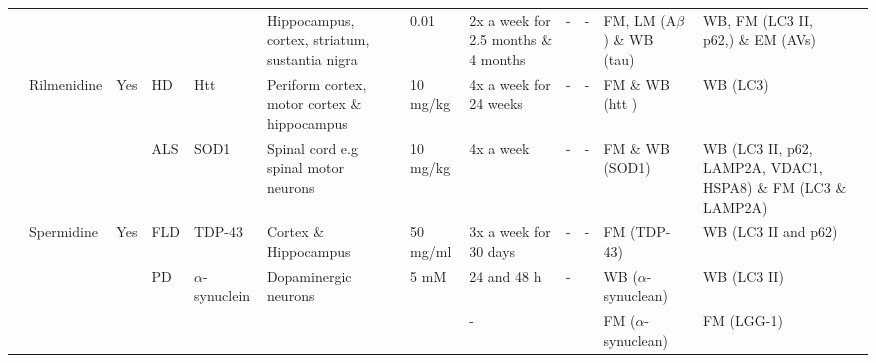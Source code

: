 \begin{landscape}
\begin{table}[p]
\begin{tabular}{lllllp{5cm}lllllll}
 &  &  &  &  & Hippocampus, cortex, striatum, sustantia nigra & 0.01 & 2x a week for 2.5 months \& 4 months & - & - & FM, LM (A$\beta$) \& WB (tau) & WB, FM (LC3 II, p62,) \& EM (AVs) & \citep{Rodriguez-Navarro2010}\\
 & Rilmenidine & Yes & HD  & Htt  & Periform cortex, motor cortex \& hippocampus & 10 mg/kg & 4x a week for 24 weeks & - & - & FM \& WB (htt ) & WB (LC3) & \citep{Rose2010}\\
 &  &  & ALS  & SOD1 & Spinal cord e.g spinal motor neurons & 10 mg/kg & 4x a week   & - & - & FM \& WB (SOD1) & WB (LC3 II, p62, LAMP2A, VDAC1, HSPA8) \& FM (LC3 \& LAMP2A) & \citep{Perera2018}\\
 & Spermidine & Yes & FLD  & TDP-43  & Cortex \& Hippocampus  & 50 mg/ml & 3x a week for 30 days & - & - & FM (TDP-43) & WB (LC3 II and p62) & \citep{Wang2012}\\
 &  &  & PD  & $\alpha$-synuclein  & Dopaminergic neurons & 5 mM & 24 and 48 h & - &  & WB ($\alpha$-synuclean) & WB (LC3 II) & \citep{Buttner2014}\\
 &  &  &  &  &  &  & - &  &  & FM ($\alpha$-synuclean) &  FM (LGG-1) & \\

\bottomrule
\end{tabular}
\end{table}
\end{landscape}